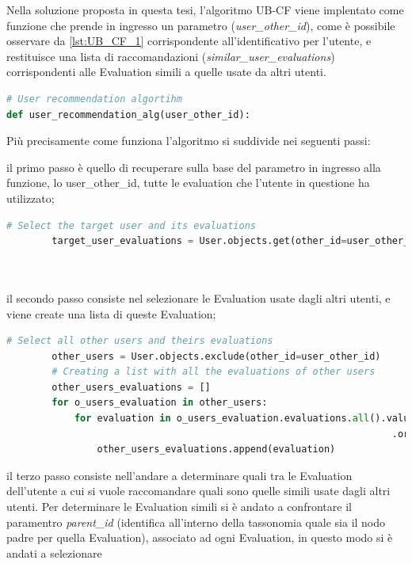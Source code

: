 Nella soluzione proposta in questa tesi, l'algoritmo UB-CF viene implentato come funzione che prende in ingresso un parametro 
(\textit{user\_other\_id}), come è possibile osservare da \ref{lst:UB_CF_1} corrispondente all'identificativo per l'utente, 
e restituisce una lista di raccomandazioni (\textit{similar\_user\_evaluations}) corrispondenti alle Evaluation simili a quelle usate da altri utenti. 

\lstset{style=python_code_style}
\begin{lstlisting}[language=Python, label=lst:UB_CF_1]
# User recommendation algortihm
def user_recommendation_alg(user_other_id):
\end{lstlisting}

Più precisamente come funziona l'algoritmo si suddivide nei seguenti passi:
\begin{description}
	\item il primo passo è quello di recuperare sulla base del parametro in ingresso alla funzione, lo user\_other\_id,
	tutte le evaluation che l'utente in questione ha utilizzato;
	\begin{lstlisting}[language=Python, label=lst:UB_CF_2]
		# Select the target user and its evaluations
		target_user_evaluations = User.objects.get(other_id=user_other_id).evaluations.all()\
																					.values('other_id', 'id', 'parent_id')\
																					.order_by('other_id')
	\end{lstlisting}
	\item il secondo passo consiste nel selezionare le Evaluation usate dagli altri utenti, e viene create una lista di queste Evaluation;
	\begin{lstlisting}[language=Python, label=lst:UB_CF_3]
		# Select all other users and theirs evaluations
		other_users = User.objects.exclude(other_id=user_other_id)
		# Creating a list with all the evaluations of other users
		other_users_evaluations = []
		for o_users_evaluation in other_users:
			for evaluation in o_users_evaluation.evaluations.all().values('other_id', 'id', 'parent_id')\
																	.order_by('other_id'):
				other_users_evaluations.append(evaluation)
	\end{lstlisting}
	\item il terzo passo consiste nell'andare a determinare quali tra le Evaluation dell'utente a cui si vuole raccomandare quali sono quelle 
	simili usate dagli altri utenti. Per determinare le Evaluation simili si è andato a confrontare il paramentro \textit{parent\_id} (identifica
	all'interno della tassonomia quale sia il nodo padre per quella Evaluation), associato ad ogni Evaluation, in questo modo si è andati a selezionare

\end{description}

